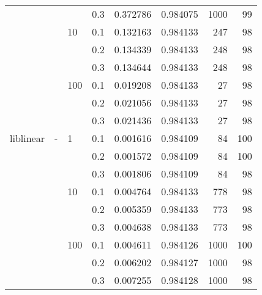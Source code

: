 \begin{table}[H]
\begin{tabular}{llllrrrr}
          &   &     & 0.3 &  0.372786 &  0.984075 &    1000 &    99 \\
          &   & 10  & 0.1 &  0.132163 &  0.984133 &     247 &    98 \\
          &   &     & 0.2 &  0.134339 &  0.984133 &     248 &    98 \\
          &   &     & 0.3 &  0.134644 &  0.984133 &     248 &    98 \\
          &   & 100 & 0.1 &  0.019208 &  0.984133 &      27 &    98 \\
          &   &     & 0.2 &  0.021056 &  0.984133 &      27 &    98 \\
          &   &     & 0.3 &  0.021436 &  0.984133 &      27 &    98 \\
liblinear & - & 1   & 0.1 &  0.001616 &  0.984109 &      84 &   100 \\
          &   &     & 0.2 &  0.001572 &  0.984109 &      84 &   100 \\
          &   &     & 0.3 &  0.001806 &  0.984109 &      84 &    98 \\
          &   & 10  & 0.1 &  0.004764 &  0.984133 &     778 &    98 \\
          &   &     & 0.2 &  0.005359 &  0.984133 &     773 &    98 \\
          &   &     & 0.3 &  0.004638 &  0.984133 &     773 &    98 \\
          &   & 100 & 0.1 &  0.004611 &  0.984126 &    1000 &   100 \\
          &   &     & 0.2 &  0.006202 &  0.984127 &    1000 &    98 \\
          &   &     & 0.3 &  0.007255 &  0.984128 &    1000 &    98 \\
\bottomrule
\end{tabular}
\end{table}
